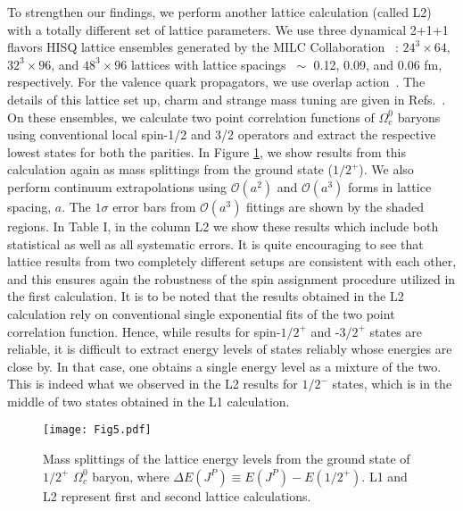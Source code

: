 \documentclass[showkeys,aps,twocolumn,showpacs,preprintnumbers,amsmath,amssymb,prd,letterpaper,floatfix,nofootinbib,superscriptaddress,]{revtex4-1}
\newcommand\bef{\begin{figure}}
\newcommand\eef[1]{\label{fg:#1}\end{figure}}
\newcommand\fgn[1]{Figure \ref{fg:#1}}
\begin{document}
{To strengthen our findings, we perform another lattice calculation (called L2) with a
totally different set of lattice parameters. 
We use three
dynamical 2+1+1 flavors HISQ lattice ensembles generated by the MILC
Collaboration~\cite{Bazavov:2012xda} : $24^3 \times 64$, $32^3 \times
96$, and $48^3 \times 96$ lattices with lattice spacings $~\sim$ 0.12,
0.09, and 0.06 fm, respectively. For the valence quark propagators,
we use overlap action~\cite{Neuberger:1997fp}. The details of this
lattice set up, charm and strange mass tuning are given in
Refs.~\cite{Basak:2012py,Basak:2013oya}. On these ensembles,  we calculate two point correlation functions of
$\Omega_c^0$ baryons using conventional local spin-1/2 and 3/2 operators and
extract the respective lowest states for both the parities. In
\fgn{second_lat_result}, we show results from this calculation again
as mass splittings from the ground state ($1/2^{+}$). We also perform continuum extrapolations using
 $\mathcal{O}(a^2)$ and $\mathcal{O}(a^3)$ forms in lattice spacing, $a$. The 
$1\sigma$ error bars from $\mathcal{O}(a^3)$ fittings 
are shown by the shaded regions. In Table I, in the column L2 we show these results which include both statistical as well as all systematic errors. 
It is quite encouraging to
see that lattice results from two completely different setups are
consistent with each other, and this ensures again the
robustness of the spin assignment procedure utilized
in the first calculation. It is to be noted that the results obtained in the L2 calculation rely on conventional single exponential fits of the two point correlation function. Hence, while results for spin-$1/2^+$ and -$3/2^+$ states are reliable, it is difficult to extract energy levels of states reliably whose energies are close by. In that case, one obtains a single energy level as a mixture of the two. This is indeed what we observed in the L2 results for $1/2^-$ states, which is in the middle of two states obtained in the L1 calculation.


\bef[t!]
\centering
\vspace*{-0.2in}
\texttt{[image: Fig5.pdf]}
\vspace{-0.08in}
\caption{Mass splittings of the lattice energy levels from the ground
  state of $1/2^{+}$ $\Omega_c^0$ baryon, where $\Delta E(J^P) \equiv E(J^P) - E(1/2^{+})$. L1 and L2 represent first and second lattice calculations.}
\eef{second_lat_result}

}
\end{document}
